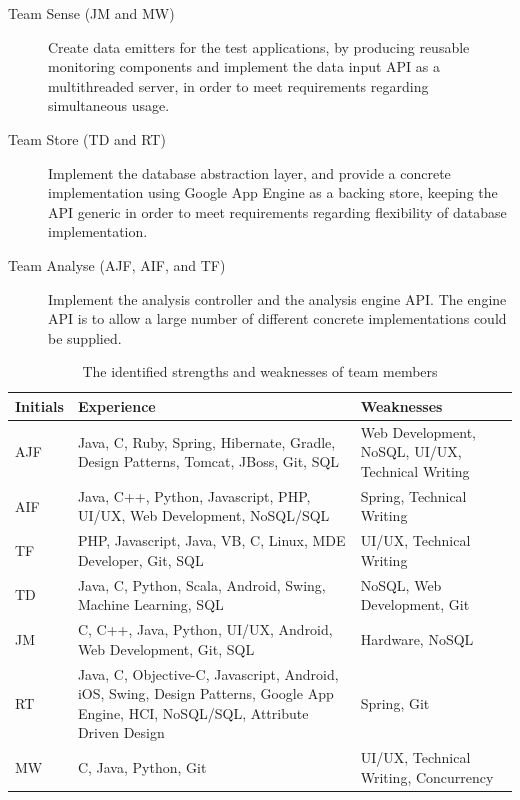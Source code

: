 \begin{description}
  \item[Team Sense  (JM and MW)] Create data emitters for the test 
  applications, by producing reusable monitoring components and 
  implement the data input API as a multithreaded server, in order to 
  meet requirements regarding simultaneous usage.
    
  \item[Team Store  (TD and RT)] Implement the database abstraction layer, and provide a concrete implementation using Google App Engine as a backing store, keeping the API generic in order to meet requirements regarding flexibility of database implementation.

  \item[Team Analyse (AJF, AIF, and TF)] Implement the analysis controller and 
  the analysis engine API. The engine API is to allow a large number of 
  different concrete implementations could be supplied. 
\end{description}

\begin{table}[H]
\centering
\begin{tabular}{|p{1.2cm}|p{8cm}|p{5cm}|}
  \hline \rowcolor{titleColor}\textbf{Initials} &
  \textbf{Experience} &
  \textbf{Weaknesses}\\

  \hline AJF
  & Java, C, Ruby, Spring, Hibernate, Gradle, Design Patterns, Tomcat, JBoss,
  Git, SQL
  & Web Development, NoSQL, UI/UX, Technical Writing \\

  \hline AIF
  & Java, C++, Python, Javascript, PHP, UI/UX, Web Development, NoSQL/SQL
  & Spring, Technical Writing \\
  
  \hline TF
  & PHP, Javascript, Java, VB, C, Linux, MDE Developer, Git, SQL
  & UI/UX, Technical Writing \\

  \hline TD
  & Java, C, Python, Scala, Android, Swing, Machine Learning, SQL
  & NoSQL, Web Development, Git \\

  \hline JM
  & C, C++, Java, Python, UI/UX, Android, Web Development, Git, SQL
  & Hardware, NoSQL \\

  \hline RT
  & Java, C, Objective-C, Javascript, Android, iOS, Swing, Design Patterns,
  Google App Engine, HCI, NoSQL/SQL, Attribute Driven Design
  & Spring, Git \\

  \hline MW
  & C, Java, Python, Git
  & UI/UX, Technical Writing, Concurrency \\
  \hline
\end{tabular}
\caption{The identified strengths and weaknesses of team members}
\label{tab:skills}
\end{table}

